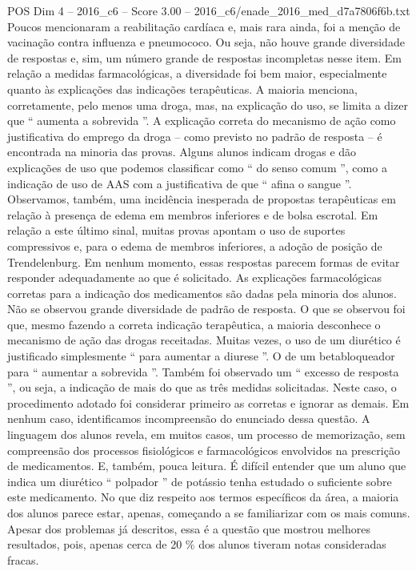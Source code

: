 \begin{textsample}{POS Dim 4 – 2016\_c6 – Score 3.00 – 2016\_c6/enade\_2016\_med\_d7a7806f6b.txt}
Poucos mencionaram a reabilitação cardíaca e, mais rara ainda, foi a menção de vacinação contra influenza e pneumococo.
Ou seja, não houve grande diversidade de respostas e, sim, um número grande de respostas incompletas nesse item.
Em relação a medidas farmacológicas, a diversidade foi bem maior, especialmente quanto às explicações das indicações terapêuticas.
A maioria menciona, corretamente, pelo menos uma droga, mas, na explicação do uso, se limita a dizer que “ aumenta a sobrevida ”.
A explicação correta do mecanismo de ação como justificativa do emprego da droga – como previsto no padrão de resposta – é encontrada na minoria das provas.
Alguns alunos indicam drogas e dão explicações de uso que podemos classificar como “ do senso comum ”, como a indicação de uso de AAS com a justificativa de que “ afina o sangue ”.
Observamos, também, uma incidência inesperada de propostas terapêuticas em relação à presença de edema em membros inferiores e de bolsa escrotal.
Em relação a este último sinal, muitas provas apontam o uso de suportes compressivos e, para o edema de membros inferiores, a adoção de posição de Trendelenburg.
Em nenhum momento, essas respostas parecem formas de evitar responder adequadamente ao que é solicitado.
As explicações farmacológicas corretas para a indicação dos medicamentos são dadas pela minoria dos alunos.
Não se observou grande diversidade de padrão de resposta.
O que se observou foi que, mesmo fazendo a correta indicação terapêutica, a maioria desconhece o mecanismo de ação das drogas receitadas.
Muitas vezes, o uso de um diurético é justificado simplesmente “ para aumentar a diurese ”.
O de um betabloqueador para “ aumentar a sobrevida ”.
Também foi observado um “ excesso de resposta ”, ou seja, a indicação de mais do que as três medidas solicitadas.
Neste caso, o procedimento adotado foi considerar primeiro as corretas e ignorar as demais.
Em nenhum caso, identificamos incompreensão do enunciado dessa questão.
A linguagem dos alunos revela, em muitos casos, um processo de memorização, sem compreensão dos processos fisiológicos e farmacológicos envolvidos na prescrição de medicamentos.
E, também, pouca leitura.
É difícil entender que um aluno que indica um diurético “ polpador ” de potássio tenha estudado o suficiente sobre este medicamento.
No que diz respeito aos termos específicos da área, a maioria dos alunos parece estar, apenas, começando a se familiarizar com os mais comuns.
Apesar dos problemas já descritos, essa é a questão que mostrou melhores resultados, pois, apenas cerca de 20 \% dos alunos tiveram notas consideradas fracas.

\end{textsample}
